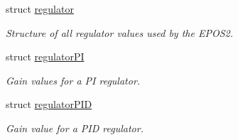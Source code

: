 \begin{DoxyCompactItemize}
struct \hyperlink{structEpos2MotorController_1_1regulator}{regulator}
\begin{DoxyCompactList}\small\item\em Structure of all regulator values used by the E\-P\-O\-S2. \end{DoxyCompactList}\item 
struct \hyperlink{structEpos2MotorController_1_1regulatorPI}{regulator\-P\-I}
\begin{DoxyCompactList}\small\item\em Gain values for a P\-I regulator. \end{DoxyCompactList}\item 
struct \hyperlink{structEpos2MotorController_1_1regulatorPID}{regulator\-P\-I\-D}
\begin{DoxyCompactList}\small\item\em Gain value for a P\-I\-D regulator. \end{DoxyCompactList}\end{DoxyCompactItemize}
